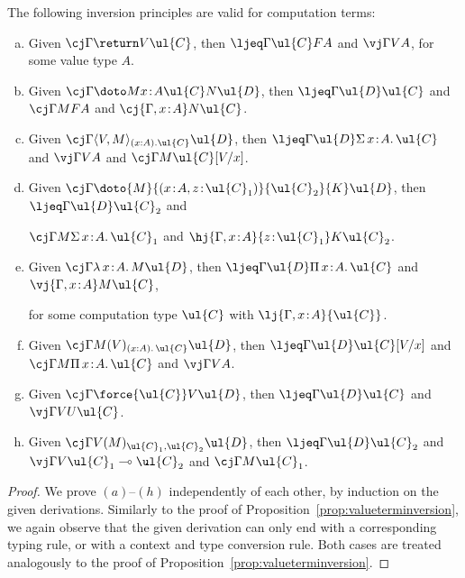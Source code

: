 \begin{proposition}
\label{prop:compterminversion}
The following inversion principles are valid for computation terms:
\begin{enumerate}[(a)]
\item Given $\cj \Gamma {\return V} \ul{C}$, then $\ljeq \Gamma {\ul{C}} {FA}$ and $\vj \Gamma V A$, for some value type $A$.
\item Given $\cj \Gamma {\doto M {x \!:\! A} {\ul{C}} {N}} \ul{D}$, then $\ljeq \Gamma {\ul{D}} {\ul{C}}$ and $\cj \Gamma M {FA}$ and $\cj {\Gamma, x \!:\! A} N {\ul{C}}$.
\item Given $\cj \Gamma {\langle V , M \rangle_{(x : A).\ul{C}}} {\ul{D}}$, then $\ljeq \Gamma {\ul{D}} {\Sigma\, x \!:\! A .\, \ul{C}}$ and $\vj \Gamma V A$ and $\cj \Gamma M {\ul{C}[V/x]}$.
\item Given $\cj \Gamma {\doto {M} {(x \!:\! A , z \!:\! \ul{C}_1)} {\ul{C}_2} {K}} {\ul{D}}$, then $\ljeq \Gamma {\ul{D}} {\ul{C}_2}$ and 

\vspace{-0.2cm}
\hfill $\cj \Gamma M {\Sigma\, x \!:\! A .\, \ul{C}_1}$ and $\hj {\Gamma, x \!:\! A} {z \!:\! \ul{C}_1} K {\ul{C}_2}$.
\item Given $\cj \Gamma {\lambda\, x \!:\! A .\, M} {\ul{D}}$, then $\ljeq \Gamma {\ul{D}} {\Pi\, x \!:\! A .\, \ul{C}}$ and $\vj {\Gamma, x \!:\! A} M {\ul{C}}$, 

\vspace{-0.2cm}
\hfill for some computation type $\ul{C}$ with $\lj {\Gamma, x \!:\! A} {\ul{C}}$.
\item Given $\cj \Gamma {M(V)_{(x : A) .\, \ul{C}}} {\ul{D}}$, then $\ljeq \Gamma {\ul{D}} {\ul{C}[V/x]}$ and $\cj \Gamma M {\Pi\, x \!:\! A .\, \ul{C}}$ and $\vj \Gamma V A$.
\item Given $\cj \Gamma {\force {\ul{C}} V} {\ul{D}}$, then $\ljeq \Gamma {\ul{D}} {\ul{C}}$ and $\vj \Gamma V {U\ul{C}}$.
\item Given $\cj \Gamma {V(M)_{\ul{C}_1, \ul{C}_2}} {\ul{D}}$, then $\ljeq \Gamma {\ul{D}} {\ul{C}_2}$ and $\vj \Gamma V {\ul{C}_1 \multimap \ul{C}_2}$ and $\cj \Gamma M {\ul{C}_1}$.
\end{enumerate}
\end{proposition}

\begin{proof}
We prove $(a)$--$(h)$ independently of each other, by induction on the given derivations. Similarly to the proof of Proposition~\ref{prop:valueterminversion}, we again observe that the given derivation can only end with a corresponding typing rule, or with a context and type conversion rule. Both cases are treated analogously to the proof of Proposition~\ref{prop:valueterminversion}.
\end{proof}

